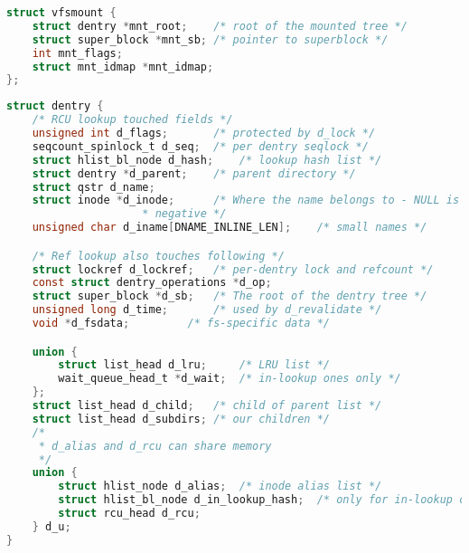 \begin{lstlisting}[language=c, caption={struct vfsmount}]
struct vfsmount {
	struct dentry *mnt_root;	/* root of the mounted tree */
	struct super_block *mnt_sb;	/* pointer to superblock */
	int mnt_flags;
	struct mnt_idmap *mnt_idmap;
};
\end{lstlisting}

\begin{lstlisting}[language=c, caption={struct dentry}]
struct dentry {
	/* RCU lookup touched fields */
	unsigned int d_flags;		/* protected by d_lock */
	seqcount_spinlock_t d_seq;	/* per dentry seqlock */
	struct hlist_bl_node d_hash;	/* lookup hash list */
	struct dentry *d_parent;	/* parent directory */
	struct qstr d_name;
	struct inode *d_inode;		/* Where the name belongs to - NULL is
					 * negative */
	unsigned char d_iname[DNAME_INLINE_LEN];	/* small names */

	/* Ref lookup also touches following */
	struct lockref d_lockref;	/* per-dentry lock and refcount */
	const struct dentry_operations *d_op;
	struct super_block *d_sb;	/* The root of the dentry tree */
	unsigned long d_time;		/* used by d_revalidate */
	void *d_fsdata;			/* fs-specific data */

	union {
		struct list_head d_lru;		/* LRU list */
		wait_queue_head_t *d_wait;	/* in-lookup ones only */
	};
	struct list_head d_child;	/* child of parent list */
	struct list_head d_subdirs;	/* our children */
	/*
	 * d_alias and d_rcu can share memory
	 */
	union {
		struct hlist_node d_alias;	/* inode alias list */
		struct hlist_bl_node d_in_lookup_hash;	/* only for in-lookup ones */
	 	struct rcu_head d_rcu;
	} d_u;
}
\end{lstlisting}

